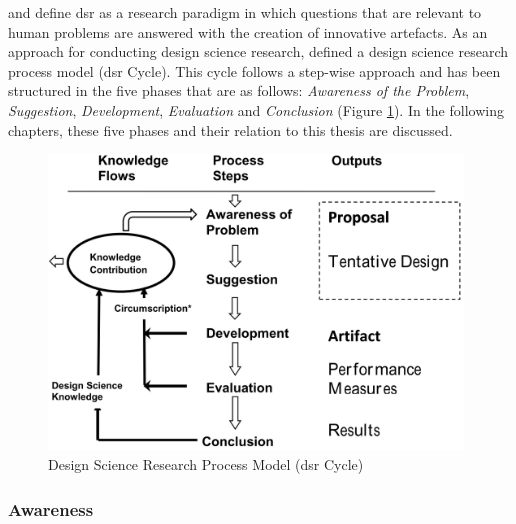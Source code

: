 \cite{Vaishnavi2008} and \cite{Hevner2010} define \gls{dsr} as a research paradigm in which questions that are relevant to human problems are answered with the creation of innovative artefacts. As an approach for conducting design science research, \cite{Vaishnavi2004} defined a design science research process model (\gls{dsr} Cycle). This cycle follows a step-wise approach and has been structured in the five phases that are as follows: \textit{Awareness of the Problem}, \textit{Suggestion}, \textit{Development}, \textit{Evaluation} and \textit{Conclusion} (Figure \ref{fig:dsrcycle}). In the following chapters, these five phases and their relation to this thesis are discussed.
\begin{figure}[h]
	\begin{center}
		\includegraphics[width=11cm]{03_Figures/02_DSR_Cycle/DSR_Cycle.png}
		\caption[Design Science Research Process Model (\gls{dsr} Cycle)]{Design Science Research Process Model (\gls{dsr} Cycle) \citep{Vaishnavi2004}}
		\label{fig:dsrcycle}
	\end{center}
\end{figure}



\subsubsection{Awareness}

